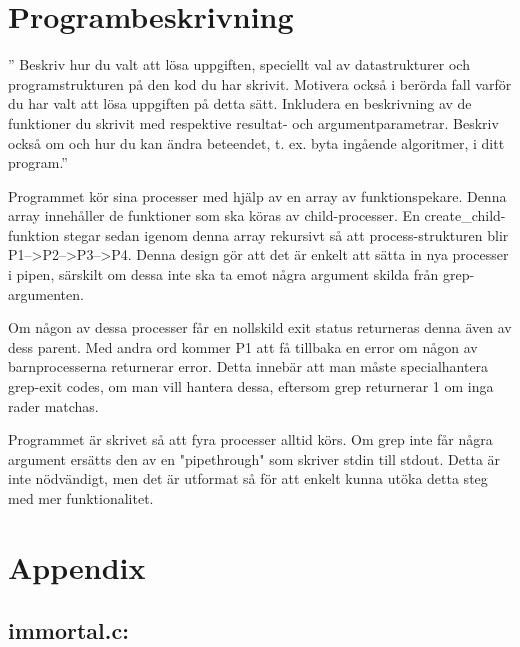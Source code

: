 \documentclass[paper=a4, fontsize=11pt]{scrartcl} %
\numberwithin{equation}{section} %
\numberwithin{figure}{section} %
\numberwithin{table}{section} %
\begin{document}
\section{Programbeskrivning}

'' Beskriv hur du valt att lösa uppgiften, speciellt val av datastrukturer och
programstrukturen på den kod du har skrivit. Motivera också i berörda fall
varför du har valt att lösa uppgiften på detta sätt. Inkludera en beskrivning
av de funktioner du skrivit med respektive resultat- och argumentparametrar.
Beskriv också om och hur du kan ändra beteendet, t. ex. byta ingående
algoritmer, i ditt program.''

Programmet kör sina processer med hjälp av en array av funktionspekare. Denna
array innehåller de funktioner som ska köras av child-processer.
En create\_child-funktion stegar sedan igenom denna array rekursivt så att
process-strukturen blir P1-->P2-->P3-->P4. Denna design gör att det är enkelt
att sätta in nya processer i pipen, särskilt om dessa inte ska ta emot några
argument skilda från grep-argumenten. %

Om någon av dessa processer får en nollskild exit status returneras denna även
av dess parent. Med andra ord kommer P1 att få tillbaka en error om någon av
barnprocesserna returnerar error. Detta innebär att man måste specialhantera
grep-exit codes, om man vill hantera dessa, eftersom grep returnerar 1 om inga
rader matchas. %

Programmet är skrivet så att fyra processer alltid körs. Om grep inte får
några argument ersätts den av en "pipethrough" som skriver stdin till stdout.
Detta är inte nödvändigt, men det är utformat så för att enkelt kunna utöka
detta steg med mer funktionalitet.


\newpage
\section*{Appendix}
\subsection*{immortal.c:}
\end{document}
